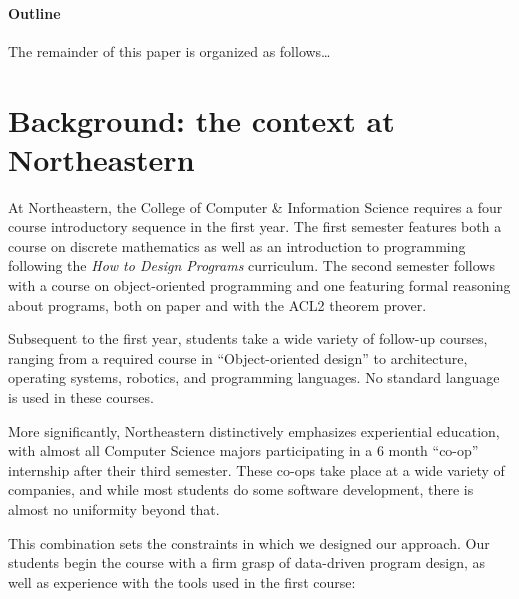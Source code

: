 \documentclass[submission,copyright]{eptcs}
\begin{document}
\paragraph{Outline} The remainder of this paper is organized as follows\dots




\section{Background: the context at Northeastern}

At Northeastern, the College of Computer \& Information Science
requires a four course introductory sequence in the first year.  The
first semester features both a course on discrete mathematics as well
as an introduction to programming following the \emph{How to Design
  Programs} curriculum.  The second semester follows with a course on
object-oriented programming and one featuring formal reasoning about
programs, both on paper and with the ACL2 theorem prover.  

Subsequent to the first year, students take a wide variety of
follow-up courses, ranging from a required course in ``Object-oriented
design'' to architecture, operating systems, robotics, and programming
languages.  No standard language is used in these courses.  

More significantly, Northeastern distinctively emphasizes experiential
education, with almost all Computer Science majors participating in a
6 month ``co-op'' internship after their third semester.  These co-ops
take place at a wide variety of companies, and while most students do
some software development, there is almost no uniformity beyond that. 

This combination sets the constraints in which we designed our
approach.  Our students begin the course with a firm grasp of
data-driven program design, as well as experience with the tools used
in the first course:
\end{document}

